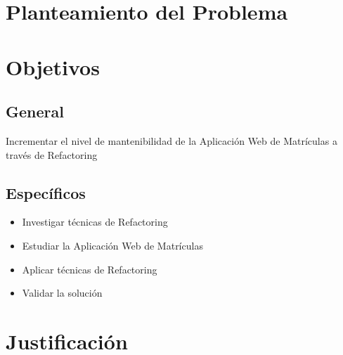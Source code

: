 \section{Planteamiento del Problema}




\setlength{\parskip}{0em}
\section{Objetivos}

\subsection{General}
Incrementar el nivel de mantenibilidad de la Aplicación Web de Matrículas a través de Refactoring

\subsection{Específicos}
\begin{itemize}
    \item Investigar técnicas de Refactoring
    \item Estudiar la Aplicación Web de Matrículas
    \item Aplicar técnicas de Refactoring 
    \item Validar la solución
\end{itemize}




\section{Justificación}
